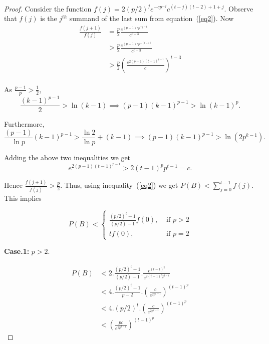 \documentclass[11pt]{article}
\begin{document}
\begin{proof}
Consider the function $f(j) = 2 (p/2)^j e^{-cp^{-j}} c^{(t - j)(t - 2) + 1 + j}$. Observe that $f(j)$ is the $j^{th}$ 
summand  of the last sum from equation~(\ref{eq2}). 
Now
\begin{equation} \label{eq3}
\begin{split}
 \frac{f(j + 1)}{f(j)} & = \frac{p}{2} \frac{e^{(p-1)cp^{-j-1}}}{c^{t-3}} \\
 & >  \frac{p}{2} \frac{e^{(p-1)cp^{-(t-1)}}}{c^{t-3}} \\
 & >  \frac{p}{2} \left(\frac{e^{2 (p-1) (t-1)^{p-1}}}{c}\right)^{t-3} \\
\end{split}
\end{equation}

As $\frac{p - 1}{p} > \frac{1}{2}$,  $$\frac{(k-1)^{p-1}}{2} > \ln (k-1) \implies (p-1)(k-1)^{p-1} > \ln (k-1)^p.$$ 

Furthermore,  $$\frac{(p-1)}{\ln p} (k-1)^{p-1} > \frac{\ln 2}{\ln p} + (k-1) \implies (p-1) (k-1)^{p-1} > \ln(2 p^{k-1}).$$
 
 Adding the above two inequalities we get 
 $$e^{2 (p-1) (t-1)^{p-1}} > 2 (t-1)^p p^{t-1} = c.$$

Hence $\frac{f(j + 1)}{f(j)} > \frac{p}{2}$. Thus, using inequality~(\ref{eq2}) we get 
$P(B)  < \sum\limits_{j=0}^{t - 1} f(j)$.  This implies
 
\medskip 
 
\[P(B) < \begin{cases}
\frac{(p/2)^t - 1}{(p/2) - 1}f(0), & \text{  if } p > 2 \\
t f(0), & \text{  if } p = 2
\end{cases}
\]



\medskip

\textbf{Case.1:} $p > 2$.

\begin{equation} \label{eq4}
\begin{split}
 P(B) & < 2. \frac{(p/2)^t - 1}{(p/2) - 1}. \frac{c^{(t - 1)^2}}{e^{2(t - 1)^p p^{t - 1}}} \\
 & < 4. \frac{(p/2)^t - 1}{p - 2}. \left(\frac{c}{e^{2 p^{t - 1}}}\right)^{(t - 1)^p} \\
 & <  4. (p/2)^t. \left(\frac{c}{e^{2 p^{t - 1}}}\right)^{(t - 1)^p} \\
 & < \left(\frac{pc}{e^{2 p^{t - 1}}}\right)^{(t - 1)^p}
\end{split}
\end{equation}


\end{proof}
\end{document}
